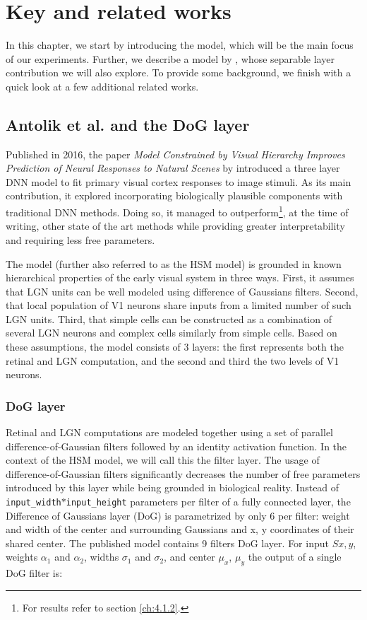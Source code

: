 \chapter{Key and related works}\label{ch:2}

In this chapter, we start by introducing the \cite{antolik} model, which will be the main focus of our experiments. Further, we describe a model by \cite{klidnt}, whose separable layer contribution we will also explore. To provide some background, we finish with a quick look at a few additional related works.

\section{Antolik et al. and the DoG layer}

Published in 2016, the paper \textit{Model Constrained by Visual Hierarchy Improves Prediction of Neural Responses to Natural Scenes} by \cite{antolik} introduced a three layer DNN model to fit primary visual cortex responses to image stimuli. As its main contribution, it explored incorporating biologically plausible components with traditional DNN methods. Doing so, it managed to outperform\footnote{For results refer to section \ref{ch:4.1.2}.}, at the time of writing, other state of the art methods while providing greater interpretability and requiring less free parameters.

The model (further also referred to as the HSM model) is grounded in known hierarchical properties of the early visual system in three ways. First, it assumes that LGN units can be well modeled using difference of Gaussians filters. Second, that local population of V1 neurons share inputs from a limited number of such LGN units. Third, that simple cells can be constructed as a combination of several LGN neurons and complex cells similarly from simple cells. Based on these assumptions, the model consists of 3 layers: the first represents both the retinal and LGN computation, and the second and third the two levels of V1 neurons.

\subsection{DoG layer}\label{ch:2.1.1}

Retinal and LGN computations are modeled together using a set of parallel difference-of-Gaussian filters followed by an identity activation function. In the context of the HSM model, we will call this the filter layer. The usage of difference-of-Gaussian filters significantly decreases the number of free parameters introduced by this layer while being grounded in biological reality. Instead of \texttt{input\_width}$*$\texttt{input\_height} parameters per filter of a fully connected layer, the Difference of Gaussians layer (DoG) is parametrized by only 6 per filter: weight and width of the center and surrounding Gaussians and x, y coordinates of their shared center. The published model contains 9 filters DoG layer. For input $S{x,y}$, weights $\alpha_1$ and $\alpha_2$, widths $\sigma_1$ and $\sigma_2$, and center $\mu_x$, $\mu_y$ the output of a single DoG filter is:

